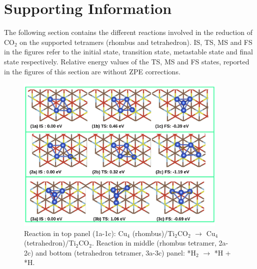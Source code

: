 \section{Supporting Information}

The following section contains the different reactions involved in the reduction of CO$_2$ on the supported tetramers (rhombus and tetrahedron). IS, TS, MS and FS in the figures refer to the initial state, transition state, metastable state and final state respectively. Relative energy values of the TS, MS and FS states, reported in the figures of this section are without ZPE corrections.

\begin{figure}[ht!]
  \begin{center}
    \includegraphics[width=0.9\textwidth]{./Appendix3/figures_si/p_101.jpg}
  \end{center}
    \caption{Reaction in top panel (1a-1c): Cu$_4$ (rhombus)/Ti$_2$CO$_2$ $\rightarrow$ Cu$_4$ (tetrahedron)/Ti$_2$CO$_2$. Reaction in middle (rhombus tetramer, 2a-2c) and bottom (tetrahedron tetramer, 3a-3c) panel: *H$_2$ $\rightarrow$ *H + *H. }
  \label{fig:si-101}
\end{figure}

